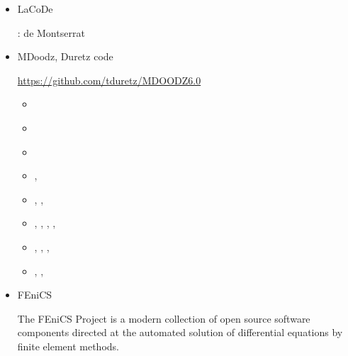 \begin{itemize}
\cite{maierova}
\cite{mals14}

\item {\codefont LaCoDe}  

\begin{scriptsize}
\noindent
\twothousandnineteen: de Montserrat \etal \cite{demh19}
\end{scriptsize}

\item {\codefont MDoodz}, Duretz code

\url{https://github.com/tduretz/MDOODZ6.0}

\begin{scriptsize}
\begin{itemize}
\item[\twothousandtwelve]    \textcite{yatd12}
\item[\twothousandthirteen]  \textcite{yahb13}
\item[\twothousandfifteen]   \textcite{yadm15}
\item[\twothousandsixteen]   \textcite{dumy16},  \textcite{dupm16}
\item[\twothousandnineteen]  \textcite{chmd19},  \textcite{dual19},  \textcite{pedm19}
\item[\twothousandtwenty]    \textcite{poyd20},  \textcite{bedh20},  \textcite{casd20}, 
                             \textcite{chsm20},  \textcite{auwy20}
\item[\twothousandtwentyone] \textcite{pody21},  \textcite{cadm21},  \textcite{auwy21},
                             \textcite{poyd21}
\item[\twothousandtwentytwo] \textcite{auyd22},  \textcite{yadb22},  \textcite{cads22}
\end{itemize}
\end{scriptsize}

\item {\codefont FEniCS} 

The FEniCS Project is a modern collection of open source
software components directed at the automated solution of
differential equations by finite element methods.


\end{itemize}
